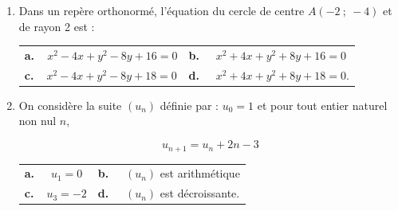 \documentclass[10pt]{article}
\begin{document}
\begin{enumerate}
\medskip

\item Dans un repère orthonormé, l'équation du cercle de centre $A (-2~;~-4)$ et de rayon 2
est :

\medskip

\begin{tabularx}{\linewidth}{*{2}{X}}
\textbf{a.~~}$ x^2 - 4x + y^2 - 8y + 16 = 0$ &\textbf{b.~~} $x^2 + 4x + y^2 + 8y + 16 = 0 $\\\textbf{c.~~}$ x^2 - 4x + y^2 - 8y + 18 = 0$& \textbf{d.~~} $x^2 + 4x + y^2 + 8y+ 18 = 0  $.
\end{tabularx}

\medskip

\item On considère la suite $\left(u_n\right)$ définie par : $u_0 = 1$ et pour tout entier naturel non nul $n$, 

\[u_{n+1} = u_n + 2n - 3\]

\medskip

\begin{tabularx}{\linewidth}{*{2}{X}}
\textbf{a.~~} $u_1 = 0 $ &\textbf{b.~~} $\left(u_n\right)$ est arithmétique \\\textbf{c.~~}$u_3 = -2 $& \textbf{d.~~} $\left(u_n\right)$ est décroissante.
\end{tabularx}
\end{enumerate}

\vspace{0,5cm}
\end{document}
